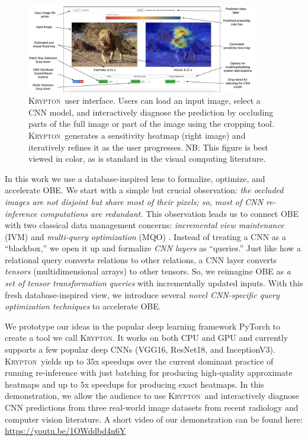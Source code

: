 \documentclass{vldb}
\newcommand{\system}{\textsc{Krypton}}
\begin{document}
\begin{figure}[t]\label{img:ui}
\centering
\includegraphics[width=0.9\textwidth]{images/ui_actual_compressed.pdf}
\caption{\system~user interface. Users can load an input image, select a CNN model, and interactively diagnose the prediction by occluding parts of the full image or part of the image using the cropping tool. \system~generates a sensitivity heatmap (right image) and iteratively refines it as the user progresses. NB: This figure is best viewed in color, as is standard in the visual computing literature.}
\end{figure}

In this work we use a database-inspired lens to formalize, optimize, and accelerate OBE. We start with a simple but crucial observation: \textit{the occluded images are not disjoint but share most of their pixels; so, most of CNN re-inference computations are redundant.} This observation leads us to connect OBE with two classical data management concerns: \textit{incremental view maintenance} (IVM) \cite{chirkova2012materialized} and \textit{multi-query optimization} (MQO) \cite{sellis1988multiple}. Instead of treating a CNN as a ``blackbox,'' we open it up and formalize \textit{CNN layers} as ``queries.'' Just like how a relational query converts relations to other relations, a CNN layer converts \textit{tensors} (multidimensional arrays) to other tensors. So, we reimagine OBE as \textit{a set of tensor transformation queries} with incrementally updated inputs. With this fresh database-inspired view, we introduce several \textit{novel CNN-specific query optimization techniques} to accelerate OBE.

We prototype our ideas in the popular deep learning framework PyTorch to create a tool we call \system. It works on both CPU and GPU and currently supports a few popular deep CNNs (VGG16, ResNet18, and InceptionV3).
\system ~yields up to $35$x speedups over the current dominant practice of running re-inference with just batching for producing high-quality approximate heatmaps and up to $5$x speedups for producing exact heatmaps.
In this demonstration, we allow the audience to use \system~and interactively diagnose CNN predictions from three real-world image datasets from recent radiology and computer vision literature.
A short video of our demonstration can be found here: \url{https://youtu.be/1OWddbd4n6Y}
\end{document}
